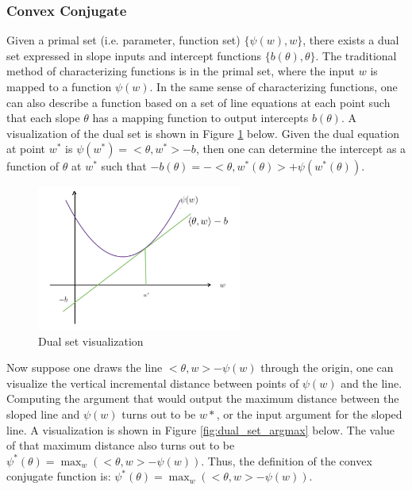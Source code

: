 \documentclass[11pt]{article}
\begin{document}
\subsubsection{Convex Conjugate}
Given a primal set (i.e. parameter, function set) $\{ \psi(w), w \}$, there exists a dual set expressed in slope inputs and intercept functions $\{ b(\theta), \theta \}$. The traditional method of characterizing functions is in the primal set, where the input $w$ is mapped to a function $\psi(w)$. In the same sense of characterizing functions, one can also describe a function based on a set of line equations at each point such that each slope $\theta$ has a mapping function to output intercepts $b(\theta)$. A visualization of the dual set is shown in Figure \ref{fig:dual_set_graph} below. Given the dual equation at point $w^*$ is $\psi(w^*) = <\theta, w^*> - b$, then one can determine the intercept as a function of $\theta$ at $w^*$ such that $-b(\theta) = -<\theta, w^*(\theta)> + \psi(w^*(\theta))$.

\begin{figure}[H]
    \centering
    \includegraphics[width=0.6\textwidth]{f2.jpg}
    \caption{Dual set visualization}
    \label{fig:dual_set_graph}
\end{figure}

Now suppose one draws the line $<\theta, w> - \psi(w)$ through the origin, one can visualize the vertical incremental distance between points of $\psi(w)$ and the line. Computing the argument that would output the maximum distance between the sloped line and $\psi(w)$ turns out to be $w*$, or the input argument for the sloped line. A visualization is shown in Figure \ref{fig:dual_set_argmax} below. The value of that maximum distance also turns out to be $\psi^*(\theta) = \max_w (<\theta, w> - \psi(w))$. Thus, the definition of the convex conjugate function is: $\psi^*(\theta) = \max_w (<\theta, w> - \psi(w))$. 
\end{document}
